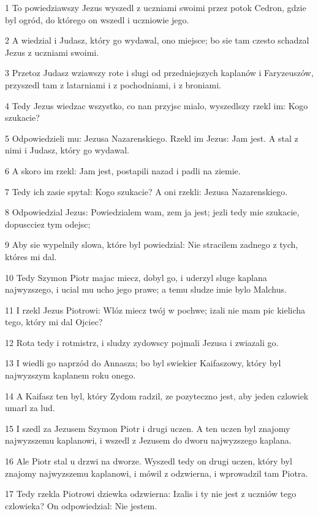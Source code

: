 \par 1 To powiedziawszy Jezus wyszedl z uczniami swoimi przez potok Cedron, gdzie byl ogród, do którego on wszedl i uczniowie jego.
\par 2 A wiedzial i Judasz, który go wydawal, ono miejsce; bo sie tam czesto schadzal Jezus z uczniami swoimi.
\par 3 Przetoz Judasz wziawszy rote i slugi od przedniejszych kaplanów i Faryzeuszów, przyszedl tam z latarniami i z pochodniami, i z broniami.
\par 4 Tedy Jezus wiedzac wszystko, co nan przyjsc mialo, wyszedlszy rzekl im: Kogo szukacie?
\par 5 Odpowiedzieli mu: Jezusa Nazarenskiego. Rzekl im Jezus: Jam jest. A stal z nimi i Judasz, który go wydawal.
\par 6 A skoro im rzekl: Jam jest, postapili nazad i padli na ziemie.
\par 7 Tedy ich zasie spytal: Kogo szukacie? A oni rzekli: Jezusa Nazarenskiego.
\par 8 Odpowiedzial Jezus: Powiedzialem wam, zem ja jest; jezli tedy mie szukacie, dopuscciez tym odejsc;
\par 9 Aby sie wypelnily slowa, które byl powiedzial: Nie stracilem zadnego z tych, któres mi dal.
\par 10 Tedy Szymon Piotr majac miecz, dobyl go, i uderzyl sluge kaplana najwyzszego, i ucial mu ucho jego prawe; a temu sludze imie bylo Malchus.
\par 11 I rzekl Jezus Piotrowi: Wlóz miecz twój w pochwe; izali nie mam pic kielicha tego, który mi dal Ojciec?
\par 12 Rota tedy i rotmistrz, i sludzy zydowscy pojmali Jezusa i zwiazali go.
\par 13 I wiedli go naprzód do Annasza; bo byl swiekier Kaifaszowy, który byl najwyzszym kaplanem roku onego.
\par 14 A Kaifasz ten byl, który Zydom radzil, ze pozyteczno jest, aby jeden czlowiek umarl za lud.
\par 15 I szedl za Jezusem Szymon Piotr i drugi uczen. A ten uczen byl znajomy najwyzszemu kaplanowi, i wszedl z Jezusem do dworu najwyzszego kaplana.
\par 16 Ale Piotr stal u drzwi na dworze. Wyszedl tedy on drugi uczen, który byl znajomy najwyzszemu kaplanowi, i mówil z odzwierna, i wprowadzil tam Piotra.
\par 17 Tedy rzekla Piotrowi dziewka odzwierna: Izalis i ty nie jest z uczniów tego czlowieka? On odpowiedzial: Nie jestem.
